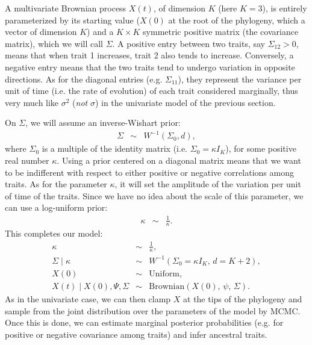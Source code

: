 \documentclass[usletter]{article}
\begin{document}
A multivariate Brownian process $X(t)$, of dimension $K$ (here $K=3$),
is entirely parameterized by its starting value ($X(0)$ at the root of the phylogeny, which a vector of dimension $K$) and a $K \times K$ symmetric positive matrix (the covariance matrix), which we will call $\Sigma$.
A positive entry between two traits, say $\Sigma_{12} > 0$, means that when trait 1 increases, trait 2 also tends to increase. Conversely, a negative entry means that the two traits tend to undergo variation in opposite directions.
As for the diagonal entries (e.g. $\Sigma_{11}$), they represent the variance per unit of time (i.e. the rate of evolution) of each trait considered marginally,
thus very much like $\sigma^2$ (\emph{not} $\sigma$) in the univariate model of the previous section.

On $\Sigma$, we will assume an inverse-Wishart prior:
\begin{eqnarray*}
\Sigma &\sim& W^{-1}(\Sigma_0, d),
\end{eqnarray*}
where $\Sigma_0$ is a multiple of the identity matrix (i.e. $\Sigma_0 = \kappa I_K$), for some positive real number $\kappa$.
Using a prior centered on a diagonal matrix means that we want to be indifferent with respect to either positive or negative correlations among traits. As for the parameter $\kappa$, it will set the amplitude of the variation per unit of time of the traits. Since we have no idea about the scale of this parameter, we can use a log-uniform prior:
\begin{eqnarray*}
\kappa &\sim& \frac{1}{\kappa}.
\end{eqnarray*}
This completes our model:
\begin{eqnarray*}
\kappa &\sim& \frac{1}{\kappa},
\\
\Sigma \mid \kappa &\sim& W^{-1}(\Sigma_0 = \kappa I_K , \, d = K+2),
\\
X(0) &\sim& \text{Uniform},
\\
X(t) \mid X(0), \Psi, \Sigma &\sim& \text{Brownian}(X(0), \, \psi, \, \Sigma).
\end{eqnarray*}
As in the univariate case, we can then clamp $X$ at the tips of the phylogeny and sample from the joint distribution over the parameters of the model by MCMC.
Once this is done, we can estimate marginal posterior probabilities (e.g. for positive or negative covariance among traits) and infer ancestral traits.
\end{document}
